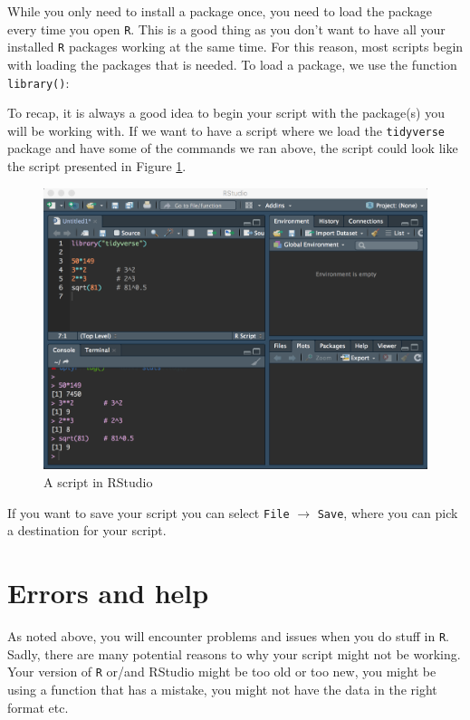 \documentclass[12pt,oneside]{reedthesis}
\theoremstyle{definition}
\theoremstyle{definition}
\theoremstyle{definition}
\theoremstyle{remark}
\begin{document}
  While you only need to install a package once, you need to load the
  package every time you open \texttt{R}. This is a good thing as you
  don't want to have all your installed \texttt{R} packages working at the
  same time. For this reason, most scripts begin with loading the packages
  that is needed. To load a package, we use the function
  \texttt{library()}:
  \begin{Shaded}
  \begin{Highlighting}[]
  \NormalTok{(}\NormalTok{)}
  \end{Highlighting}
  \end{Shaded}
  To recap, it is always a good idea to begin your script with the
  package(s) you will be working with. If we want to have a script where
  we load the \texttt{tidyverse} package and have some of the commands we
  ran above, the script could look like the script presented in Figure
  \ref{fig:interfacescript}.
  \begin{figure}
  \includegraphics[width=1\linewidth]{fig/rstudio_script} \caption{A script in RStudio}\label{fig:interfacescript}
  \end{figure}
  If you want to save your script you can select \texttt{File}
  \(\rightarrow\) \texttt{Save}, where you can pick a destination for your
  script.
  
  \section{Errors and help}\label{errors-and-help}
  
  As noted above, you will encounter problems and issues when you do stuff
  in \texttt{R}. Sadly, there are many potential reasons to why your
  script might not be working. Your version of \texttt{R} or/and RStudio
  might be too old or too new, you might be using a function that has a
  mistake, you might not have the data in the right format etc.
  
\end{document}
